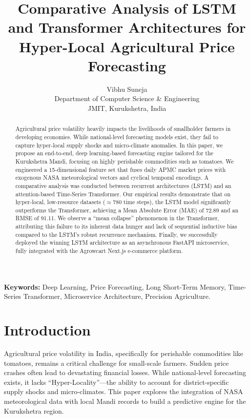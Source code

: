 \documentclass[11pt, a4paper]{article}
\title{\textbf{Comparative Analysis of LSTM and Transformer Architectures for Hyper-Local Agricultural Price Forecasting}}
\author{Vibhu Suneja \\ \small Department of Computer Science \& Engineering \\ \small JMIT, Kurukshetra, India}
\date{}
\begin{document}
\maketitle

\begin{abstract}
Agricultural price volatility heavily impacts the livelihoods of smallholder farmers in developing economies. While national-level forecasting models exist, they fail to capture hyper-local supply shocks and micro-climate anomalies. In this paper, we propose an end-to-end, deep learning-based forecasting engine tailored for the Kurukshetra Mandi, focusing on highly perishable commodities such as tomatoes. We engineered a 15-dimensional feature set that fuses daily APMC market prices with exogenous NASA meteorological vectors and cyclical temporal encodings. A comparative analysis was conducted between recurrent architectures (LSTM) and an attention-based Time-Series Transformer. Our empirical results demonstrate that on hyper-local, low-resource datasets ($\approx 780$ time steps), the LSTM model significantly outperforms the Transformer, achieving a Mean Absolute Error (MAE) of 72.89 and an RMSE of 91.11. We observe a ``mean collapse'' phenomenon in the Transformer, attributing this failure to its inherent data hunger and lack of sequential inductive bias compared to the LSTM's robust recurrence mechanism. Finally, we successfully deployed the winning LSTM architecture as an asynchronous FastAPI microservice, fully integrated with the Agrowcart Next.js e-commerce platform.
\end{abstract}

\noindent \textbf{Keywords:} Deep Learning, Price Forecasting, Long Short-Term Memory, Time-Series Transformer, Microservice Architecture, Precision Agriculture.

\section{Introduction}
Agricultural price volatility in India, specifically for perishable commodities like tomatoes, remains a critical challenge for small-scale farmers. Sudden price crashes often lead to devastating financial losses. While national-level forecasting exists, it lacks ``Hyper-Locality''---the ability to account for district-specific supply shocks and micro-climates. This paper explores the integration of NASA meteorological data with local Mandi records to build a predictive engine for the Kurukshetra region.
\end{document}
